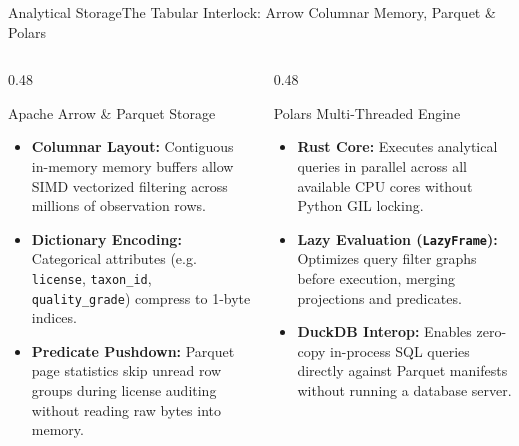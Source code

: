 \begin{frame}{Analytical Storage}{The Tabular Interlock: Arrow Columnar Memory, Parquet \& Polars}
    \begin{columns}[T]
        \begin{column}{0.48\textwidth}
            \begin{block}{Apache Arrow \& Parquet Storage}
                \begin{itemize}\footnotesize
                    \item \textbf{Columnar Layout:} Contiguous in-memory memory buffers allow SIMD vectorized filtering across millions of observation rows.
                    \item \textbf{Dictionary Encoding:} Categorical attributes (e.g. \texttt{license}, \texttt{taxon\_id}, \texttt{quality\_grade}) compress to 1-byte indices.
                    \item \textbf{Predicate Pushdown:} Parquet page statistics skip unread row groups during license auditing without reading raw bytes into memory.
                \end{itemize}
            \end{block}
        \end{column}
        \begin{column}{0.48\textwidth}
            \begin{block}{Polars Multi-Threaded Engine}
                \begin{itemize}\footnotesize
                    \item \textbf{Rust Core:} Executes analytical queries in parallel across all available CPU cores without Python GIL locking.
                    \item \textbf{Lazy Evaluation (\texttt{LazyFrame}):} Optimizes query filter graphs before execution, merging projections and predicates.
                    \item \textbf{DuckDB Interop:} Enables zero-copy in-process SQL queries directly against Parquet manifests without running a database server.
                \end{itemize}
            \end{block}
        \end{column}
    \end{columns}

\end{frame}

